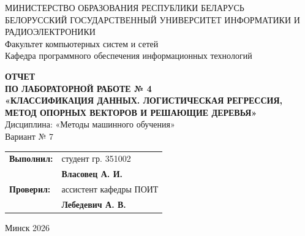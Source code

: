 \documentclass[14pt,a4paper]{extarticle}
\begin{document}
\begin{titlepage}
\thispagestyle{empty}
\begin{center}
  МИНИСТЕРСТВО ОБРАЗОВАНИЯ РЕСПУБЛИКИ БЕЛАРУСЬ \\
  БЕЛОРУССКИЙ ГОСУДАРСТВЕННЫЙ УНИВЕРСИТЕТ ИНФОРМАТИКИ И РАДИОЭЛЕКТРОНИКИ \\
  Факультет компьютерных систем и сетей \\
  Кафедра программного обеспечения информационных технологий \\
  \vspace{60mm}

  {\large \textbf{ОТЧЕТ}}\\
  \vspace{3mm}
  {\large \textbf{ПО ЛАБОРАТОРНОЙ РАБОТЕ № 4}}\\
  \vspace{3mm}
  {\normalsize \textbf{«КЛАССИФИКАЦИЯ ДАННЫХ. ЛОГИСТИЧЕСКАЯ РЕГРЕССИЯ, МЕТОД ОПОРНЫХ ВЕКТОРОВ И РЕШАЮЩИЕ ДЕРЕВЬЯ»}}\\
  \vspace{4mm}
  {\normalsize Дисциплина: «Методы машинного обучения»}\\
  \vspace{2mm}
  {\normalsize Вариант № 7}
\end{center}

\vspace{45mm}

\begin{flushright}
  \begin{tabular}{ll}
    \textbf{Выполнил:} & студент гр. 351002 \\
    & \textbf{Власовец А. И.} \\
    \textbf{Проверил:} & ассистент кафедры ПОИТ \\
    & \textbf{Лебедевич А. В.}
  \end{tabular}
\end{flushright}

\vfill

\begin{center}
  Минск 2026
\end{center}
\end{titlepage}

\setcounter{page}{2}

\end{document}
